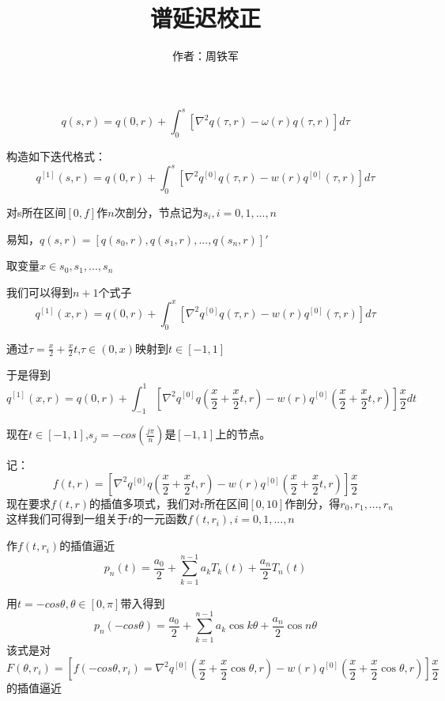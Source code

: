 \documentclass[12pt,a4paper]{article}
\title{谱延迟校正}
\author{作者：周铁军}
\date{\chntoday}
\begin{document}
\maketitle
\newpage

\begin{equation}
	q(s,r)=q(0,r)+\int_{0}^{s}[\nabla^2 q(\tau,r)-\omega(r)q(\tau,r)]d\tau
\end{equation}

构造如下迭代格式：
\begin{equation}
	q^{[1]}(s,r)=q(0,r)+\int_{0}^{s}[\nabla^2 q^{[0]}q(\tau,r)-w(r)q^{[0]}(\tau,r)]d\tau
\end{equation}

对s所在区间$[0,f]$作$n$次剖分，节点记为$s_i,i=0,1,...,n$

易知，$q(s,r)=[q(s_0,r),q(s_1,r),...,q(s_n,r)]'$

取变量$x \in {s_0,s_1,...,s_n}$

我们可以得到$n+1$个式子
\begin{equation}
	q^{[1]}(x,r)=q(0,r)+\int_{0}^{x}[\nabla^2 q^{[0]}q(\tau,r)-w(r)q^{[0]}(\tau,r)]d\tau
\end{equation}

通过$\tau=\frac{x}{2}+\frac{x}{2} t$,$\tau \in (0,x)$映射到$t \in [-1,1]$

于是得到
\begin{equation}
	q^{[1]}(x,r)=q(0,r)+\int_{-1}^{1}[\nabla^2 q^{[0]}q(\frac{x}{2}+\frac{x}{2} t,r)-w(r)q^{[0]}(\frac{x}{2}+\frac{x}{2} t,r)]\frac{x}{2}dt
\end{equation}

现在$t\in[-1,1]$,$s_j=-cos(\frac{j\pi}{n})$是$[-1,1]$上的节点。

 记：$$f(t,r)=[\nabla^2 q^{[0]}q(\frac{x}{2}+\frac{x}{2} t,r)-w(r)q^{[0]}(\frac{x}{2}+\frac{x}{2} t,r)]\frac{x}{2}$$
 现在要求$f(t,r)$的插值多项式，我们对r所在区间$[0,10]$作剖分，得$r_0,r_1,...,r_n$
 这样我们可得到一组关于$t$的一元函数$f(t,r_i),i=0,1,...,n$

作$f(t,r_i)$的插值逼近
\begin{equation}
	p_{n}(t)=\frac{a_0}{2}+\sum_{k=1}^{n-1}a_k T_k(t)+\frac{a_n}{2}T_n(t)
\end{equation}

用$t=-cos\theta,\theta \in [0,\pi]$带入得到
\begin{equation}
	p_n(-cos\theta)=\frac{a_0}{2}+\sum_{k=1}^{n-1}a_k \cos k\theta+\frac{a_n}{2}\cos n\theta
\end{equation}
该式是对
\begin{equation}
	F(\theta,r_i)=[f(-cos\theta,r_i)=\nabla^2 q^{[0]}(\frac{x}{2}+\frac{x}{2} \cos \theta,r)-w(r)q^{[0]}(\frac{x}{2}+\frac{x}{2}\cos \theta ,r)]\frac{x}{2}
\end{equation}
的插值逼近

















\cite{tam19912d}

\end{document}
